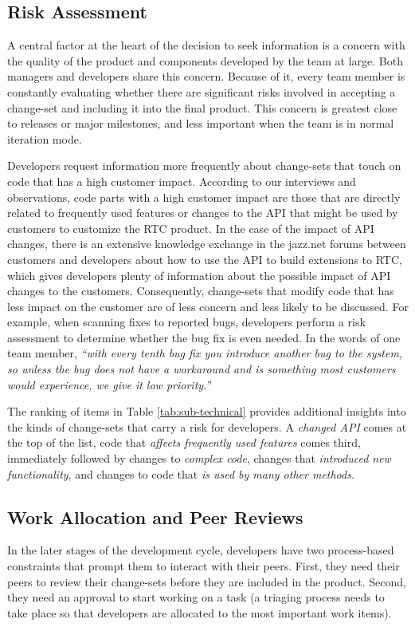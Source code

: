 \subsection{Risk Assessment}
A central factor at the heart of the decision to seek information is a concern with the quality of the product and components developed by the team at large. Both managers and developers share this concern. Because of it, every team member is constantly evaluating whether there are significant risks involved in accepting a change-set and including it into the final product. This concern is greatest close to releases or major milestones, and less important when the team is in normal iteration mode.

Developers request information more frequently about change-sets that touch on code that has a high customer impact. According to our interviews and observations, code parts with a high customer impact are those that are directly related to frequently used features or changes to the API that might be used by customers to customize the RTC product. In the case of the impact of API changes, there is an extensive knowledge exchange in the jazz.net forums between customers and developers about how to use the API to build extensions to RTC, which gives developers plenty of information about the possible impact of API changes to the customers. Consequently, change-sets that modify code that has less impact on the customer are of less concern and less likely to be discussed. For example, when scanning fixes to reported bugs, developers perform a risk assessment to determine whether the bug fix is even needed. In the words of one team member, \emph{``with every tenth bug fix you introduce another bug to the system, so unless the bug does not have a workaround and is something most customers would experience, we give it low priority.''}

The ranking of items in Table \ref{tab:sub-technical} provides additional insights into the kinds of change-sets that carry a risk for developers. A \emph{changed API} comes at the top of the list, code that \emph{affects frequently used features} comes third, immediately followed by changes to \emph{complex code}, changes that \emph{introduced new functionality}, and changes to code that \emph{is used by many other methods}.


\subsection{Work Allocation and Peer Reviews}
In the later stages of the development cycle, developers have two process-based constraints that prompt them to interact with their peers. First, they need their peers to review their change-sets before they are included in the product. Second, they need an approval to start working on a task (a triaging process needs to take place so that developers are allocated to the most important work items).

